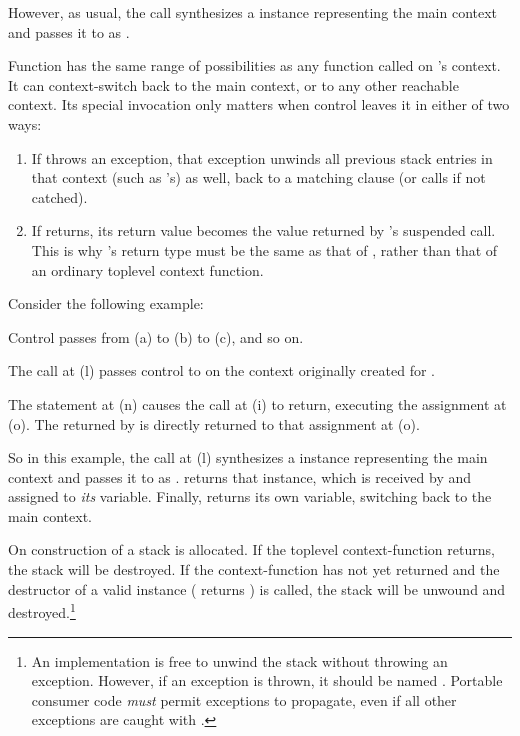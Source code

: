 However, as usual, the  call synthesizes a \ectx
instance representing the main context and passes it to 
as .

Function  has the same range of possibilities as any function called
on 's context. It can context-switch back to the main context, or to
any other reachable context. Its special invocation only matters when control
leaves it in either of two ways:

\begin{enumerate}
  \item If  throws an exception, that exception unwinds all previous
  stack entries in that context (such as 's) as well, back to a
  matching  clause (or calls  if not catched).
  \item If  returns, its return value becomes the value returned
  by 's suspended  call. This is
  why 's return type must be the same as that of \op, rather than
  that of an ordinary toplevel context function.
\end{enumerate}

Consider the following example:


Control passes from (a) to (b) to (c), and so on.

The  call at (l) passes control
to  on the context originally created for .

The  statement at (n) causes the \op call at (i) to return,
executing the assignment at (o). The  returned by 
is directly returned to that assignment at (o).

So in this example, the call at (l) synthesizes a \ectx instance representing
the main context and passes it to  as .  returns
that  instance, which is received by  and assigned
to \emph{its}  variable. Finally,  returns its
own  variable, switching back to the main context.


On construction of  a stack is allocated. If the toplevel
context-function returns, the stack will be destroyed. If the context-function
has not yet returned and the destructor of a valid 
instance ( returns ) is
called, the stack will be unwound and destroyed.\footnote{An implementation is
free to unwind the stack without throwing an exception. However, if an
exception is thrown, it should be named .
Portable consumer code \emph{must} permit 
exceptions to propagate, even if all other exceptions are caught
with .}

